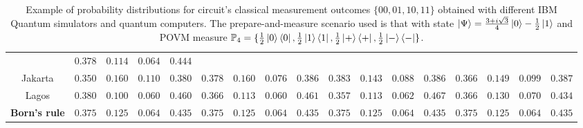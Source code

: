 \begin{table}
\begin{tabular}{c|cccc|cccc|cccc|cccc}
                & $\scriptstyle0.378$ & $\scriptstyle0.114$ & $\scriptstyle0.064$ & $\scriptstyle0.444$\\
Jakarta         & $\scriptstyle0.350$ & $\scriptstyle0.160$ & $\scriptstyle0.110$ & $\scriptstyle0.380$ 
                & $\scriptstyle0.378$ & $\scriptstyle0.160$ & $\scriptstyle0.076$ & $\scriptstyle0.386$ 
                & $\scriptstyle0.383$ & $\scriptstyle0.143$ & $\scriptstyle0.088$ & $\scriptstyle0.386$
                & $\scriptstyle0.366$ & $\scriptstyle0.149$ & $\scriptstyle0.099$ & $\scriptstyle0.387$\\   
Lagos           & $\scriptstyle0.380$ & $\scriptstyle0.100$ & $\scriptstyle0.060$ & $\scriptstyle0.460$ 
                & $\scriptstyle0.366$ & $\scriptstyle0.113$ & $\scriptstyle0.060$ & $\scriptstyle0.461$ 
                & $\scriptstyle0.357$ & $\scriptstyle0.113$ & $\scriptstyle0.062$ & $\scriptstyle0.467$
                & $\scriptstyle0.366$ & $\scriptstyle0.130$ & $\scriptstyle0.070$ & $\scriptstyle0.434$\\
\midrule
\textbf{Born's rule}    & $\scriptstyle0.375$ & $\scriptstyle0.125$ & $\scriptstyle0.064$ & $\scriptstyle0.435$ 
                        & $\scriptstyle0.375$ & $\scriptstyle0.125$ & $\scriptstyle0.064$ & $\scriptstyle0.435$ 
                        & $\scriptstyle0.375$ & $\scriptstyle0.125$ & $\scriptstyle0.064$ & $\scriptstyle0.435$ 
                        & $\scriptstyle0.375$ & $\scriptstyle0.125$ & $\scriptstyle0.064$ & $\scriptstyle0.435$ \\
\bottomrule        
\end{tabular}
\caption{Example of probability distributions for circuit's classical measurement outcomes $\{00, 01, 10, 11\}$ obtained with different IBM Quantum simulators and quantum computers. The prepare-and-measure scenario used is that with state $\ket{\Psi}=\frac{3 + i \sqrt{3}}{4} \ket{0} - \frac{1}{2} \ket{1}$ and POVM measure $\mathbb{P}_4 = \{\frac{1}{2}\ket{0}\bra{0}, \frac{1}{2}\ket{1}\bra{1}, \frac{1}{2}\ket{+}\bra{+}, \frac{1}{2}\ket{-}\bra{-} \}$.}
\label{table:quantum_results}
\end{table}

